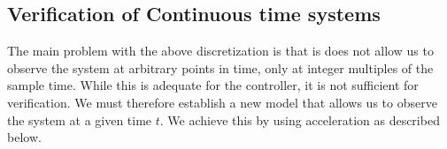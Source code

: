 \documentclass[sigconf]{llncs}
\begin{document}
 \subsection{Verification of Continuous time systems}\label{sec:continuous_time_accel}
The main problem with the above discretization is that is does not allow us to observe the system at arbitrary points in time, only at integer multiples of the sample time. While this is adequate for the controller, it is not sufficient for verification. We must therefore establish a new model that allows us to observe the system at a given time $t$. We achieve this by using acceleration as described below. 

\end{document}
